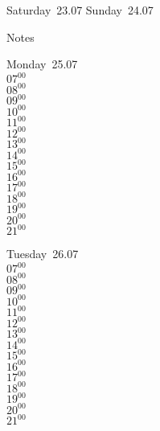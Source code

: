 \documentclass[11pt,a4paper]{book}\usepackage[]{graphicx}\usepackage[]{color}
\begin{document}
\begin{weekendbox}
  Saturday~23.07
  \tcblower
  Sunday~24.07
\end{weekendbox} %
\begin{notebox}
  Notes
\end{notebox}
\clearpage
\begin{headerbox}
\end{headerbox}
\begin{weekdaybox}
  Monday~25.07\\
  { 
  \vfill
  $07^{00}$\\
$08^{00}$\\
$09^{00}$\\
$10^{00}$\\
$11^{00}$\\
$12^{00}$\\
$13^{00}$\\
$14^{00}$\\
$15^{00}$\\
$16^{00}$\\
$17^{00}$\\
$18^{00}$\\
$19^{00}$\\
$20^{00}$\\
$21^{00}$\\
  }
\end{weekdaybox}
\begin{weekdaybox}
  Tuesday~26.07\\
  { 
  \vfill
  $07^{00}$\\
$08^{00}$\\
$09^{00}$\\
$10^{00}$\\
$11^{00}$\\
$12^{00}$\\
$13^{00}$\\
$14^{00}$\\
$15^{00}$\\
$16^{00}$\\
$17^{00}$\\
$18^{00}$\\
$19^{00}$\\
$20^{00}$\\
$21^{00}$\\
  }
\end{weekdaybox}
\end{document}
